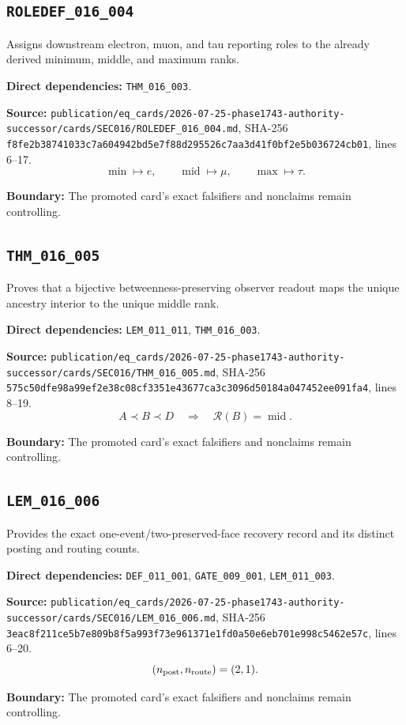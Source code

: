 \subsection*{\texttt{ROLEDEF_016_004}}
Assigns downstream electron, muon, and tau reporting roles to the already derived minimum, middle, and maximum ranks.
\par\noindent\textbf{Direct dependencies:} \texttt{THM_016_003}.
\par\noindent\textbf{Source:} \texttt{publication/eq_cards/2026-07-25-phase1743-authority-successor/cards/SEC016/ROLEDEF_016_004.md}, SHA-256 \texttt{f8fe2b38741033c7a604942bd5e7f88d295526c7aa3d41f0bf2e5b036724cb01}, lines 6--17.
\[\min\mapsto e,\qquad \operatorname{mid}\mapsto\mu,\qquad \max\mapsto\tau.\]
\par\noindent\textbf{Boundary:} The promoted card's exact falsifiers and nonclaims remain controlling.
\subsection*{\texttt{THM_016_005}}
Proves that a bijective betweenness-preserving observer readout maps the unique ancestry interior to the unique middle rank.
\par\noindent\textbf{Direct dependencies:} \texttt{LEM_011_011}, \texttt{THM_016_003}.
\par\noindent\textbf{Source:} \texttt{publication/eq_cards/2026-07-25-phase1743-authority-successor/cards/SEC016/THM_016_005.md}, SHA-256 \texttt{575c50dfe98a99ef2e38c08cf3351e43677ca3c3096d50184a047452ee091fa4}, lines 8--19.
\[A\prec B\prec D\quad\Longrightarrow\quad \mathcal R(B)=\operatorname{mid}.\]
\par\noindent\textbf{Boundary:} The promoted card's exact falsifiers and nonclaims remain controlling.
\subsection*{\texttt{LEM_016_006}}
Provides the exact one-event/two-preserved-face recovery record and its distinct posting and routing counts.
\par\noindent\textbf{Direct dependencies:} \texttt{DEF_011_001}, \texttt{GATE_009_001}, \texttt{LEM_011_003}.
\par\noindent\textbf{Source:} \texttt{publication/eq_cards/2026-07-25-phase1743-authority-successor/cards/SEC016/LEM_016_006.md}, SHA-256 \texttt{3eac8f211ce5b7e809b8f5a993f73e961371e1fd0a50e6eb701e998c5462e57c}, lines 6--20.
\[(n_{\rm post},n_{\rm route})=(2,1).\]
\par\noindent\textbf{Boundary:} The promoted card's exact falsifiers and nonclaims remain controlling.
